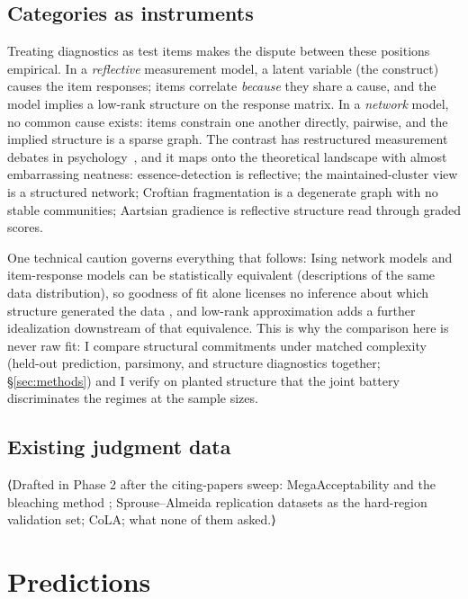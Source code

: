 \documentclass[12pt]{article}
\begin{document}
\subsection{Categories as instruments}

Treating diagnostics as test items makes the dispute between these
positions empirical. In a \emph{reflective} measurement model, a latent
variable (the construct) causes the item responses; items correlate
\emph{because} they share a cause, and the model implies a low-rank
structure on the response matrix. In a \emph{network} model, no common
cause exists: items constrain one another directly, pairwise, and the
implied structure is a sparse graph. The contrast has restructured
measurement debates in psychology~\parencite{borsboomcramer2013},
and it maps onto the theoretical landscape with almost embarrassing
neatness: essence-detection is reflective; the maintained-cluster view
is a structured network; Croftian fragmentation is a degenerate graph
with no stable communities; Aartsian gradience is reflective structure
read through graded scores.

One technical caution governs everything that follows: Ising network
models and item-response models can be statistically
equivalent (descriptions of the same data distribution), so
goodness of fit alone licenses no inference about which structure
generated the data \parencite{marsman2018}, and low-rank approximation
adds a further idealization downstream of that equivalence. This is
why the comparison here is never raw fit: I compare structural
commitments under matched complexity (held-out prediction, parsimony,
and structure diagnostics together; \S\ref{sec:methods}) and I
verify on planted structure that the joint battery discriminates the
regimes at the sample sizes.

\subsection{Existing judgment data}

⟨Drafted in Phase 2 after the citing-papers sweep: MegaAcceptability and
the bleaching method \parencite{whiterawlins2016, whiterawlins2020};
Sprouse--Almeida replication datasets as the hard-region validation set;
CoLA; what none of them asked.⟩

\section{Predictions}\label{sec:predictions}
\end{document}
